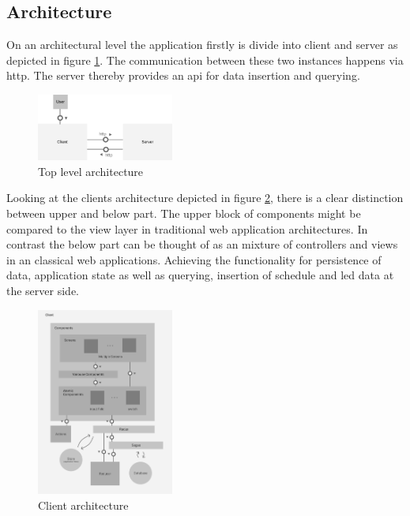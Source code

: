 \documentclass[conference]{IEEEtran}
\begin{document}
\subsection{Architecture}
On an architectural level the application firstly is divide into client and server as depicted in figure \ref{topLevelArch}.
The communication between these two instances happens via http. The server thereby provides an api for data insertion and
querying.

\begin{figure}[H]
    \centering
    \includegraphics[width=0.4\textwidth]{top_level_architecture}
    \caption{Top level architecture}
    \label{topLevelArch}
\end{figure}

Looking at the clients architecture depicted in figure \ref{clientArch}, there is a clear distinction between upper and below
part. The upper block of components might be compared to the view layer in traditional web application architectures. In contrast
the below part can be thought of as an mixture of controllers and views in an classical web applications. Achieving the functionality
for persistence of data, application state as well as querying, insertion of schedule and led data at the server side.

\begin{figure}[H]
    \centering
    \includegraphics[width=0.4\textwidth]{client_architecture}
    \caption{Client architecture}
    \label{clientArch}
\end{figure}
\end{document}

